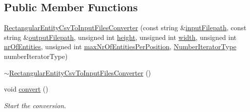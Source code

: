 \subsection*{Public Member Functions}
\begin{DoxyCompactItemize}
\item 
\hyperlink{classmultiscale_1_1video_1_1RectangularEntityCsvToInputFilesConverter_aad6061faff7cfbe5c005faf460d77951}{Rectangular\-Entity\-Csv\-To\-Input\-Files\-Converter} (const string \&\hyperlink{classmultiscale_1_1video_1_1RectangularEntityCsvToInputFilesConverter_adde5ccc0bde141f73917eba8029fe1f6}{input\-Filepath}, const string \&\hyperlink{classmultiscale_1_1video_1_1RectangularEntityCsvToInputFilesConverter_a84ea5fc8e195a17eb929812f962cb851}{output\-Filepath}, unsigned int \hyperlink{classmultiscale_1_1video_1_1RectangularEntityCsvToInputFilesConverter_a68cb5dba20157ea4977c1069626cb0ab}{height}, unsigned int \hyperlink{classmultiscale_1_1video_1_1RectangularEntityCsvToInputFilesConverter_ac4542ad4008e85ab4860146eed6e0200}{width}, unsigned int \hyperlink{classmultiscale_1_1video_1_1RectangularEntityCsvToInputFilesConverter_aebbddb80b0b0e44e4ea8e111994a2f5d}{nr\-Of\-Entities}, unsigned int \hyperlink{classmultiscale_1_1video_1_1RectangularEntityCsvToInputFilesConverter_adcea224ee3e6f8fbecca3754774afbac}{max\-Nr\-Of\-Entities\-Per\-Position}, \hyperlink{namespacemultiscale_a6ef911f4d48a4bf5e657c237ec169ff5}{Number\-Iterator\-Type} number\-Iterator\-Type)
\item 
\hyperlink{classmultiscale_1_1video_1_1RectangularEntityCsvToInputFilesConverter_af3085f7d4f6836c0d5edf19f4a59bac7}{$\sim$\-Rectangular\-Entity\-Csv\-To\-Input\-Files\-Converter} ()
\item 
void \hyperlink{classmultiscale_1_1video_1_1RectangularEntityCsvToInputFilesConverter_a7cf56e73e5b1c627bab05d4be3cdb405}{convert} ()
\begin{DoxyCompactList}\small\item\em Start the conversion. \end{DoxyCompactList}\end{DoxyCompactItemize}
